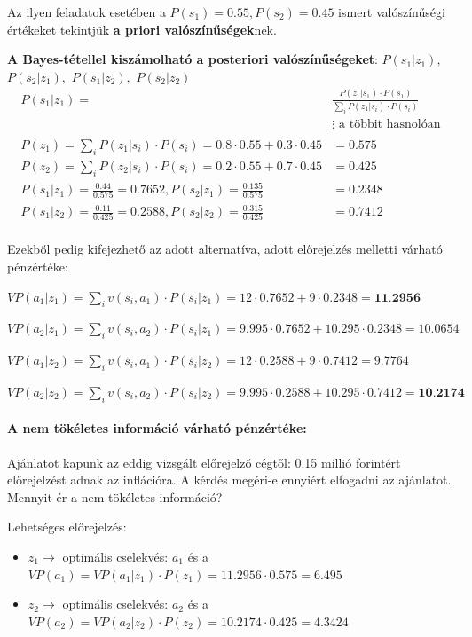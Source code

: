 \documentclass[a4paper,12pt]{article}
\begin{document}
Az ilyen feladatok esetében a $P(s_1) = 0.55 , P(s_2) = 0.45$ ismert valószínűségi értékeket tekintjük \textbf{a priori valószínűségek}nek. 

\textbf{A Bayes-tétellel kiszámolható a posteriori valószínűségeket}: $P(s_1|z_1),$ $P(s_2|z_1),$ $ P(s_1|z_2),$ $P(s_2|z_2)$
\begin{equation}
\begin{split}
P(s_1|z_1) =& \frac{P(z_{1}|s_1) \cdot  P(s_1)}{\sum_{i}^{ } P(z_{1}|s_i) \cdot  P(s_i)} \\
&\vdots \text{ a többit hasnolóan} \\
\\
P(z_1)=\sum_{i}^{ } P(z_{1}|s_i) \cdot  P(s_i) =  0.8\cdot 0.55+0.3\cdot 0.45 &= 0.575 \\
P(z_2)=\sum_{i}^{ } P(z_{2}|s_i) \cdot  P(s_i) =  0.2\cdot 0.55+0.7\cdot 0.45 &= 0.425 \\
P(s_1|z_1) = \frac{0.44}{0.575} = 0.7652,  
P(s_2|z_1) = \frac{0.135}{0.575} &= 0.2348 \\
P(s_1|z_2) = \frac{0.11}{0.425} = 0.2588,
P(s_2|z_2) = \frac{0.315}{0.425} &= 0.7412
\\
\end{split}
\end{equation}

Ezekből pedig kifejezhető az adott alternatíva, adott előrejelzés melletti várható pénzértéke:

$VP(a_1|z_1) = \sum_{i}^{ }v(s_i,a_1)\cdot P(s_i|z_1) = 12\cdot 0.7652 + 9\cdot 0.2348 = \textbf{11.2956}$ 
 
$VP(a_2|z_1) = \sum_{i}v(s_i,a_2)\cdot P(s_i|z_1) = 9.995\cdot 0.7652 + 10.295\cdot 0.2348 = 10.0654$ 

$VP(a_1|z_2) = \sum_{i}v(s_i,a_1)\cdot P(s_i|z_2) = 12\cdot 0.2588 + 9\cdot 0.7412 = 9.7764$  

$VP(a_2|z_2) = \sum_{i}v(s_i,a_2)\cdot P(s_i|z_2) = 9.995\cdot 0.2588 + 10.295\cdot 0.7412 = \textbf{10.2174}$

\paragraph{A nem tökéletes információ várható pénzértéke: }

Ajánlatot kapunk az eddig vizsgált előrejelző cégtől: 0.15 millió forintért előrejelzést adnak az inflációra. A kérdés megéri-e ennyiért elfogadni az ajánlatot. Mennyit ér a nem tökéletes információ?

Lehetséges előrejelzés:
\begin{itemize}
\item $z_{1} \rightarrow$ optimális cselekvés: $a_1$  és a $VP(a_1) = VP(a_1|z_1) \cdot  P(z_1) = 11.2956\cdot 0.575 = 6.495$
\item $z_{2} \rightarrow$ optimális cselekvés: $a_2$  és a $VP(a_2) = VP(a_2|z_2) \cdot  P(z_2) = 10.2174\cdot 0.425 = 4.3424$
\end{itemize}
\end{document}

